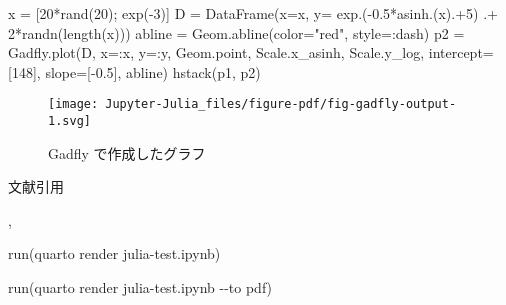 \documentclass[
  letterpaper,
  DIV=11,
  pandoc,
  ja=standard,
  jafont=haranoaji]{bxjsarticle}
\newenvironment{Shaded}{\begin{snugshade}}{\end{snugshade}}
\newcommand{\FloatTok}[1]{\textcolor[rgb]{0.68,0.00,0.00}{#1}}
\newcommand{\FunctionTok}[1]{\textcolor[rgb]{0.28,0.35,0.67}{#1}}
\newcommand{\NormalTok}[1]{\textcolor[rgb]{0.00,0.48,0.65}{#1}}
\newcommand{\OperatorTok}[1]{\textcolor[rgb]{0.37,0.37,0.37}{#1}}
\newcommand{\SpecialStringTok}[1]{\textcolor[rgb]{0.13,0.47,0.30}{#1}}
\newcommand{\StringTok}[1]{\textcolor[rgb]{0.13,0.47,0.30}{#1}}
\begin{document}
\begin{Shaded}
\begin{Highlighting}[]
\NormalTok{x }\OperatorTok{=}\NormalTok{ [}\FloatTok{20}\FunctionTok{*rand}\NormalTok{(}\FloatTok{20}\NormalTok{)}\OperatorTok{;} \FunctionTok{exp}\NormalTok{(}\OperatorTok{{-}}\FloatTok{3}\NormalTok{)]}
\NormalTok{D }\OperatorTok{=} \FunctionTok{DataFrame}\NormalTok{(x}\OperatorTok{=}\NormalTok{x}\OperatorTok{,}\NormalTok{ y}\OperatorTok{=} \FunctionTok{exp}\NormalTok{.(}\OperatorTok{{-}}\FloatTok{0.5}\FunctionTok{*asinh}\NormalTok{.(x)}\OperatorTok{.+}\FloatTok{5}\NormalTok{) }\OperatorTok{.+} \FloatTok{2}\FunctionTok{*randn}\NormalTok{(}\FunctionTok{length}\NormalTok{(x)))}
\NormalTok{abline }\OperatorTok{=}\NormalTok{ Geom.}\FunctionTok{abline}\NormalTok{(color}\OperatorTok{=}\StringTok{"red"}\OperatorTok{,}\NormalTok{ style}\OperatorTok{=:}\NormalTok{dash)}
\NormalTok{p2 }\OperatorTok{=}\NormalTok{ Gadfly.}\FunctionTok{plot}\NormalTok{(D}\OperatorTok{,}\NormalTok{ x}\OperatorTok{=:}\NormalTok{x}\OperatorTok{,}\NormalTok{ y}\OperatorTok{=:}\NormalTok{y}\OperatorTok{,}\NormalTok{  Geom.point}\OperatorTok{,}\NormalTok{  Scale.x\_asinh}\OperatorTok{,}\NormalTok{ Scale.y\_log}\OperatorTok{,}
\NormalTok{     intercept}\OperatorTok{=}\NormalTok{[}\FloatTok{148}\NormalTok{]}\OperatorTok{,}\NormalTok{ slope}\OperatorTok{=}\NormalTok{[}\OperatorTok{{-}}\FloatTok{0.5}\NormalTok{]}\OperatorTok{,}\NormalTok{ abline)}
\FunctionTok{hstack}\NormalTok{(p1}\OperatorTok{,}\NormalTok{ p2)}
\end{Highlighting}
\end{Shaded}

\begin{figure}

{\centering \texttt{[image: Jupyter-Julia\_files/figure-pdf/fig-gadfly-output-1.svg]}

}

\caption{\label{fig-gadfly}Gadfly で作成したグラフ}

\end{figure}

文献引用

\autocite{R-quarto}, \textcite{R-rmdja}

\begin{Shaded}
\begin{Highlighting}[]
\FunctionTok{run}\NormalTok{(}\SpecialStringTok{\textasciigrave{}quarto render julia{-}test.ipynb\textasciigrave{}}\NormalTok{)}
\end{Highlighting}
\end{Shaded}

\begin{Shaded}
\begin{Highlighting}[]
\FunctionTok{run}\NormalTok{(}\SpecialStringTok{\textasciigrave{}quarto render julia{-}test.ipynb {-}{-}to pdf\textasciigrave{}}\NormalTok{)}
\end{Highlighting}
\end{Shaded}


\printbibliography
\end{document}
